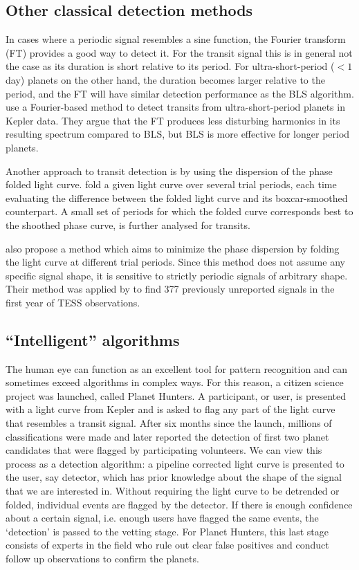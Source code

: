 \subsection{Other classical detection methods}
In cases where a periodic signal resembles a sine function, the Fourier transform (FT) provides a good way to detect it. For the transit signal this is in general not the case as its duration is short relative to its period. For ultra-short-period ($< 1$ day) planets on the other hand, the duration becomes larger relative to the period, and the FT will have similar detection performance as the BLS algorithm. \cite{sanchis2014study} use a Fourier-based method to detect transits from ultra-short-period planets in Kepler data.
They argue that the FT produces less disturbing harmonics in its resulting spectrum compared to BLS, but BLS is more effective for longer period planets. 
    
Another approach to transit detection is by using the dispersion of the phase folded light curve. \cite{plavchan2008near} fold a given light curve over several trial periods, each time evaluating the difference between the folded light curve and its boxcar-smoothed counterpart. A small set of periods for which the folded curve corresponds best to the shoothed phase curve, is further analysed for transits.
   
\cite{wheeler2019weird} also propose a method which aims to minimize the phase dispersion by folding the light curve at different trial periods. Since this method does not assume any specific signal shape, it is sensitive to strictly periodic signals of arbitrary shape. Their method was applied by \cite{chakraborty2020hundreds} to find 377 previously unreported signals in the first year of TESS observations.


\subsection{``Intelligent'' algorithms}
The human eye can function as an excellent tool for pattern recognition and can sometimes exceed algorithms in complex ways.  For this reason, a citizen science project was launched, called Planet Hunters. A participant, or user, is presented with a light curve from Kepler and is asked to flag any part of the light curve that resembles a transit signal. After six months since the launch, millions of classifications were made and later \cite{fischer2012planet} reported the detection of first two planet candidates that were flagged by participating volunteers. We can view this process as a detection algorithm: a pipeline corrected light curve is presented to the user, say detector, which has prior knowledge about the shape of the signal that we are interested in. Without requiring the light curve to be detrended or folded, individual events are flagged by the detector. If there is enough confidence about a certain signal, i.e. enough users have flagged the same events, the `detection' is passed to the vetting stage. For Planet Hunters, this last stage consists of experts in the field who rule out clear false positives and conduct follow up observations to confirm the planets. 

